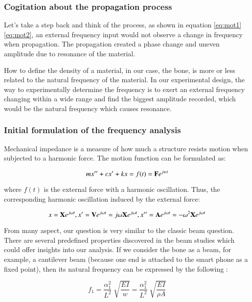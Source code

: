 \documentclass{sigchi}
\begin{document}
\subsubsection{Cogitation about the propagation process} 

Let's take a step back and think of the process, as shown in equation \eqref{eq:mot1}\eqref{eq:mot2}, an external frequency input would not observe a change in frequency when propagation. The propagation created a phase change and uneven amplitude due to resonance of the material. 

How to define the density of a material, in our case, the bone, is more or less related to the natural frequency of the material. In our experimental design, the way to experimentally determine the frequency is to exert an external frequency changing within a wide range and find the biggest amplitude recorded, which would be the natural frequency which causes resonance.  

\subsubsection{Initial formulation of the frequency analysis} 

Mechanical impedance is a measure of how much a structure resists motion when subjected to a harmonic force. The motion function can be formulated as:

\begin{equation} \label{eq:mot1}
mx''+cx'+kx=f(t)={\bf F}e^{jwt}
\end{equation}

where $f(t)$ is the external force with a harmonic oscillation. Thus, the corresponding harmonic oscillation induced by the external force: 

\begin{equation} \label{eq:mot2}
x={\bf X}e^{j\omega t}, x'={\bf V}e^{j \omega t}=j\omega{\bf X}e^{j\omega t}, x''={\bf A}e^{j \omega t}=-\omega^2{\bf X}e^{j \omega t}
\end{equation}

From many aspect, our question is very similar to the classic beam question. There are several predefined properties discovered in the beam studies which could offer insights into our analysis. If we consider the bone as a beam, for example, a cantilever beam (because one end is attached to the smart phone as a fixed point), then its natural frequency can be expressed by the following \cite{Young:2002:formula}:

\begin{equation} \label{eq:beam}
f_1=\frac{\alpha_1^2}{L^2}\sqrt[]{\frac{EI}{w}}=\frac{\alpha_1^2}{L^2}\sqrt[]{\frac{EI}{\rho A}} 
\end{equation}
\end{document}
